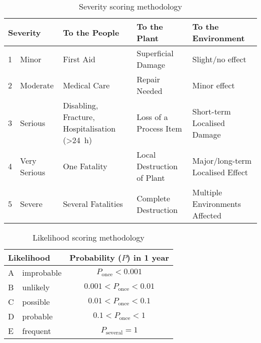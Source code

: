 \begin{table}[H]
\centering
\caption{Severity scoring methodology}
\label{tab:severity-methodology}
\begin{tabularx}{\linewidth}{llXXX}
\toprule
\multicolumn{2}{l}{\textbf{Severity}} & \textbf{To the People}                                     & \textbf{To the Plant}      & \textbf{To the Environment}      \\ \midrule
1          & Minor             & First Aid                                                  & Superficial Damage         & Slight/no effect                 \\
2          & Moderate          & Medical Care                                               & Repair Needed              & Minor effect                     \\
3          & Serious           & Disabling, Fracture, Hospitalisation (\SI{>24}{\hour})     & Loss of a Process Item     & Short-term Localised Damage      \\
4          & Very Serious      & One Fatality                                               & Local Destruction of Plant & Major/long-term Localised Effect \\
5          & Severe            & Several Fatalities                                          & Complete Destruction       & Multiple Environments Affected   \\ \bottomrule
\end{tabularx}
\end{table}

\begin{table}[H]
\centering
\caption{Likelihood scoring methodology}
\label{tab:likelihood-methodology}
\begin{tabular}{llc}
\toprule
\multicolumn{2}{l}{Likelihood} & Probability ($P$) in 1 year              \\ \midrule
A & improbable & $         P_\mathrm{once} < 0.001 $ \\
B & unlikely   & $ 0.001 < P_\mathrm{once} < 0.01  $ \\
C & possible   & $ 0.01  < P_\mathrm{once} < 0.1   $ \\
D & probable   & $ 0.1   < P_\mathrm{once} < 1     $ \\
E & frequent   & $         P_\mathrm{several} = 1  $ \\ \bottomrule
\end{tabular}
\end{table}